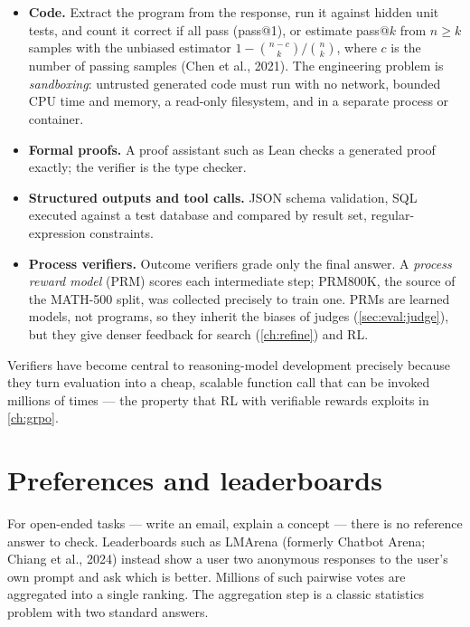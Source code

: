 \begin{itemize}
  \item \textbf{Code.} Extract the program from the response, run it against hidden unit tests,
  and count it correct if all pass (pass@1), or estimate pass@$k$ from $n \ge k$ samples with the
  unbiased estimator $1 - \binom{n-c}{k}/\binom{n}{k}$, where $c$ is the number of passing samples
  (Chen et al., 2021). The engineering problem is \emph{sandboxing}: untrusted generated code must
  run with no network, bounded CPU time and memory, a read-only filesystem, and in a separate
  process or container.
  \item \textbf{Formal proofs.} A proof assistant such as Lean checks a generated proof
  exactly; the verifier is the type checker.
  \item \textbf{Structured outputs and tool calls.} JSON schema validation, SQL executed against a
  test database and compared by result set, regular-expression constraints.
  \item \textbf{Process verifiers.} Outcome verifiers grade only the final answer. A
  \emph{process reward model} (PRM) scores each intermediate step; PRM800K, the source of the
  MATH-500 split, was collected precisely to train one. PRMs are learned models, not programs, so
  they inherit the biases of judges (\cref{sec:eval:judge}), but they give denser feedback for
  search (\cref{ch:refine}) and RL.
\end{itemize}

Verifiers have become central to reasoning-model development precisely because they turn
evaluation into a cheap, scalable function call that can be invoked millions of times --- the
property that RL with verifiable rewards exploits in \cref{ch:grpo}.

\section{Preferences and leaderboards}\label{sec:eval:leaderboards}


For open-ended tasks --- write an email, explain a concept --- there is no reference answer to
check. Leaderboards such as LMArena (formerly Chatbot Arena; Chiang et al., 2024) instead show a
user two anonymous responses to the user's own prompt and ask which is better. Millions of such
pairwise votes are aggregated into a single ranking. The aggregation step is a classic statistics
problem with two standard answers.

